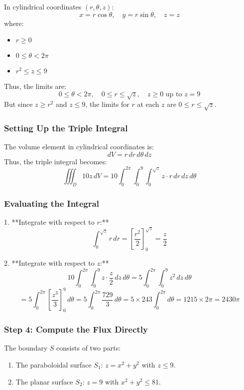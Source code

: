 \documentclass[11pt]{article}
\begin{document}
In cylindrical coordinates \((r, \theta, z)\):
\[
x = r \cos\theta, \quad y = r \sin\theta, \quad z = z
\]
where:
\begin{itemize}
    \item \( r \geq 0 \)
    \item \( 0 \leq \theta < 2\pi \)
    \item \( r^2 \leq z \leq 9 \)
\end{itemize}

Thus, the limits are:
\[
0 \leq \theta < 2\pi, \quad 0 \leq r \leq \sqrt{z}, \quad z \geq 0 \text{ up to } z=9
\]
But since \( z \geq r^2 \) and \( z \leq 9 \), the limits for \( r \) at each \( z \) are \( 0 \leq r \leq \sqrt{z} \).

\subsubsection*{Setting Up the Triple Integral}

The volume element in cylindrical coordinates is:
\[
dV = r\, dr\, d\theta\, dz
\]
Thus, the triple integral becomes:
\[
\iiint_{D} 10 z \, dV = 10 \int_{0}^{2\pi} \int_{0}^{9} \int_{0}^{\sqrt{z}} z \cdot r \, dr \, dz \, d\theta
\]

\subsubsection*{Evaluating the Integral}

1. **Integrate with respect to \( r \):**
\[
\int_{0}^{\sqrt{z}} r \, dr = \left[ \frac{r^2}{2} \right]_{0}^{\sqrt{z}} = \frac{z}{2}
\]

2. **Integrate with respect to \( z \):**
\[
10 \int_{0}^{2\pi} \int_{0}^{9} z \cdot \frac{z}{2} \, dz \, d\theta = 5 \int_{0}^{2\pi} \int_{0}^{9} z^2 \, dz \, d\theta
\]
\[
= 5 \int_{0}^{2\pi} \left[ \frac{z^3}{3} \right]_{0}^{9} \, d\theta = 5 \int_{0}^{2\pi} \frac{729}{3} \, d\theta = 5 \times 243 \int_{0}^{2\pi} d\theta = 1215 \times 2\pi = 2430\pi
\]

\subsubsection*{Step 4: Compute the Flux Directly}

The boundary \( S \) consists of two parts:
\begin{enumerate}
    \item The paraboloidal surface \( S_1 \): \( z = x^2 + y^2 \) with \( z \leq 9 \).
    \item The planar surface \( S_2 \): \( z = 9 \) with \( x^2 + y^2 \leq 81 \).
\end{enumerate}
\end{document}
